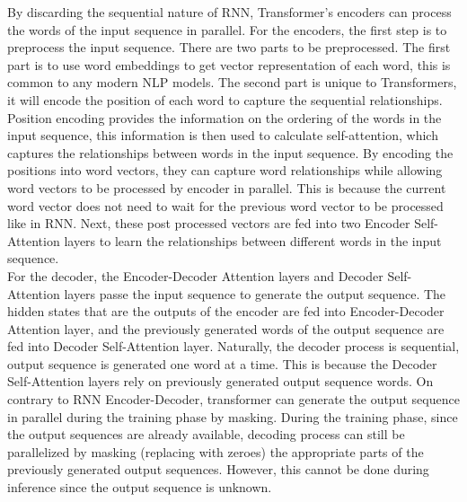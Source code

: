 \documentclass[conference]{IEEEtran}
\begin{document}
	By discarding the sequential nature of RNN, Transformer's encoders can process the words of the input sequence in parallel. For the encoders, the first step is to preprocess the input sequence. There are two parts to be preprocessed. The first part is to use word embeddings to get vector representation of each word, this is common to any modern NLP models. The second part is unique to Transformers, it will encode the position of each word to capture the sequential relationships. Position encoding provides the information on the ordering of the words in the input sequence, this information is then used to calculate self-attention, which captures the relationships between words in the input sequence. By encoding the positions into word vectors, they can capture word relationships while allowing word vectors to be processed by encoder in parallel. This is because the current word vector does not need to wait for the previous word vector to be processed like in RNN. Next, these post processed vectors are fed into two Encoder Self-Attention layers to learn the relationships between different words in the input sequence.\\
	
	For the decoder, the Encoder-Decoder Attention layers and Decoder Self-Attention layers passe the input sequence to generate the output sequence. The hidden states that are the outputs of the encoder are fed into Encoder-Decoder Attention layer, and the previously generated words of the output sequence are fed into Decoder Self-Attention layer. Naturally, the decoder process is sequential, output sequence is generated one word at a time. This is because the Decoder Self-Attention layers rely on previously generated output sequence words. On contrary to RNN Encoder-Decoder, transformer can generate the output sequence in parallel during the training phase by masking. During the training phase, since the output sequences are already available, decoding process can still be parallelized by masking (replacing with zeroes) the appropriate parts of the previously generated output sequences. However, this cannot be done during inference since the output sequence is unknown.\\
	
\end{document}
